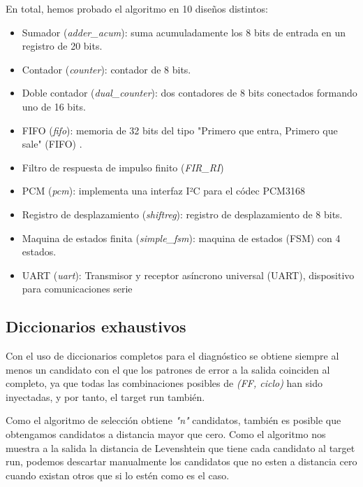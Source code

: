 En total, hemos probado el algoritmo en 10 diseños distintos:
\begin{itemize}
    \item Sumador (\textit{adder\_acum}): suma acumuladamente los 8 bits de 
        entrada en un registro de 20 bits.
    \item Contador (\textit{counter}): contador de 8 bits.
    \item Doble contador (\textit{dual\_counter}): dos contadores de 8 bits
        conectados formando uno de 16 bits.
    \item FIFO (\textit{fifo}): memoria de 32 bits del tipo "Primero que entra,
        Primero que sale" (\gls{FIFO}) \cite{FIFO}.
    \item Filtro de respuesta de impulso finito (\textit{FIR\_RI}) \cite{FIR}
    \item PCM (\textit{pcm}): implementa una interfaz I²C para el códec PCM3168
        \cite{PCM}
    \item Registro de desplazamiento (\textit{shiftreg}): registro de
        desplazamiento de 8 bits.
    \item Maquina de estados finita (\textit{simple\_fsm}): maquina de estados
        (\gls{FSM}) con 4 estados.
    \item UART (\textit{uart}): Transmisor y receptor asíncrono universal
        (\gls{UART}), dispositivo para comunicaciones serie \cite{UART}
\end{itemize}

\subsection{Diccionarios exhaustivos}
\label{subsec:LevDicExhaust}
Con el uso de diccionarios completos para el diagnóstico se obtiene siempre al 
menos un candidato con el que los patrones de error a la salida coinciden al
completo, ya que todas las combinaciones posibles de \textit{(\gls{FF}, ciclo)}
han sido inyectadas, y por tanto, el target run también.

Como el algoritmo de selección obtiene \textit{"n"} candidatos, también es posible
que obtengamos candidatos a distancia mayor que cero. Como el algoritmo nos
muestra a la salida la distancia de Levenshtein que tiene cada candidato al target
run, podemos descartar manualmente los candidatos que no esten a distancia cero
cuando existan otros que si lo estén como es el caso.

